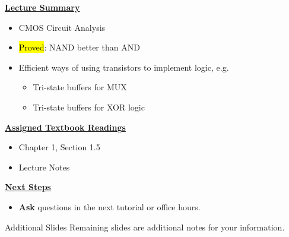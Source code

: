 \begin{frame}[fragile]
 \underline{\textbf{Lecture Summary}}
 \begin{itemize}
 \item CMOS Circuit Analysis
 \item \hl{Proved}: NAND better than AND
 \item Efficient ways of using transistors to implement logic, e.g. 
 \begin{itemize}
     \item Tri-state buffers for MUX
     \item Tri-state buffers for XOR logic
 \end{itemize}
 \end{itemize}
 \underline{\textbf{Assigned Textbook Readings}}
\begin{itemize}
\item Chapter 1, Section 1.5
     \item Lecture Notes
     \end{itemize}
    \underline{\textbf{Next Steps}}
    \begin{itemize} 
    \item \textbf{Ask} questions in the next tutorial or office hours.
 \end{itemize}
\end{frame}

\begin{frame}{Additional Slides}
     Remaining slides are additional notes for your information.
 \end{frame}


